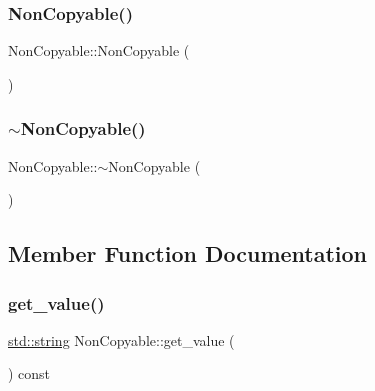 \mbox{\label{class_non_copyable_acaf21c23c4f44d693d603b0b8abbdb39}} 
\subsubsection{\texorpdfstring{NonCopyable()}{NonCopyable()}\hspace{0.1cm}{\footnotesize\ttfamily [4/4]}}
{\footnotesize\ttfamily Non\+Copyable\+::\+Non\+Copyable (\begin{DoxyParamCaption}{ }\end{DoxyParamCaption})\hspace{0.3cm}{\ttfamily [delete]}}

\mbox{\label{class_non_copyable_a41c964e648935f908b8fa28499c27527}} 
\subsubsection{\texorpdfstring{$\sim$NonCopyable()}{~NonCopyable()}}
{\footnotesize\ttfamily Non\+Copyable\+::$\sim$\+Non\+Copyable (\begin{DoxyParamCaption}{ }\end{DoxyParamCaption})\hspace{0.3cm}{\ttfamily [inline]}}



\subsection{Member Function Documentation}
\mbox{\label{class_non_copyable_ab6bc56160dc150a423d931281582ace7}} 
\subsubsection{\texorpdfstring{get\_value()}{get\_value()}}
{\footnotesize\ttfamily \mbox{\hyperlink{_s_d_l__opengl__glext_8h_ab4ccfaa8ab0e1afaae94dc96ef52dde1}{std\+::string}} Non\+Copyable\+::get\+\_\+value (\begin{DoxyParamCaption}{ }\end{DoxyParamCaption}) const\hspace{0.3cm}{\ttfamily [inline]}}

